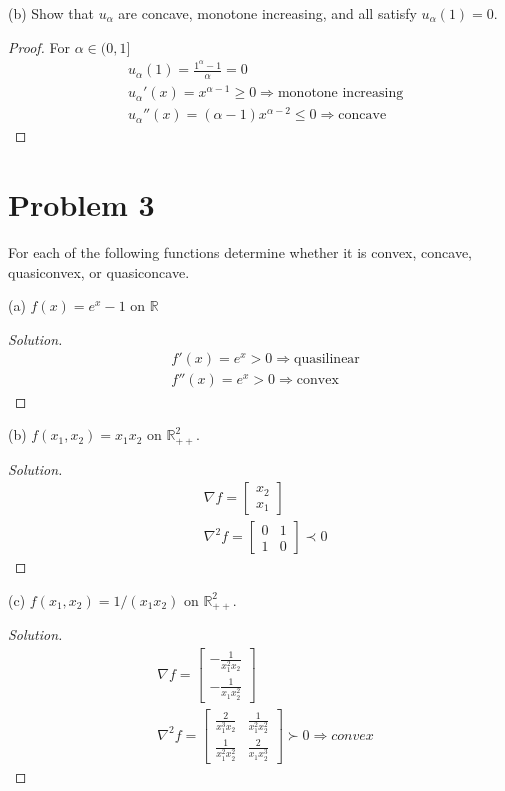 \documentclass[11pt]{article}
\newenvironment{solution}
  {\renewcommand\qedsymbol{$\square$}\begin{proof}[Solution]}
  {\end{proof}}
\newcommand{\grad}{\nabla}
\newcommand{\hess}{\nabla^2}
\newcommand{\RR}{\mathbb{R}}
\begin{document}
(b) Show that $u_\alpha$ are concave, monotone increasing, and all satisfy $u_\alpha(1) = 0$.

\begin{proof}
  For $\alpha\in(0, 1]$
  \begin{align*}
    &u_\alpha(1) = \frac{1^\alpha - 1}{\alpha} = 0\\
    &u_\alpha'(x) = x^{\alpha-1}\geq0 \Rightarrow\text{monotone increasing}\\
    &u_\alpha''(x) = (\alpha-1)x^{\alpha-2} \leq 0 \Rightarrow\text{concave}
  \end{align*}
\end{proof}

\clearpage
\section*{Problem 3}
For each of the following functions determine whether it is convex, concave, quasiconvex, or quasiconcave.

(a) $f(x)=e^x-1$ on $\RR$
\begin{solution}
  \begin{align*}
    &f'(x) = e^x > 0 \Rightarrow \text{quasilinear}\\
    &f''(x) = e^x > 0 \Rightarrow \text{convex}
  \end{align*}
\end{solution}

(b) $f\left(x_1, x_2\right)=x_1 x_2$ on $\RR_{++}^2$.
\begin{solution}
  \begin{align*}
    &\grad f = 
    \begin{bmatrix}
      x_2 \\x_1
    \end{bmatrix}\\
    &\hess f = 
    \begin{bmatrix}
      0 & 1\\1 & 0
    \end{bmatrix}\prec 0
  \end{align*}
\end{solution}

(c) $f\left(x_1, x_2\right)=1 /\left(x_1 x_2\right)$ on $\RR_{++}^2$.
\begin{solution}
  \begin{align*}
    &\grad f = 
    \begin{bmatrix}
      -\frac{1}{x_1^2x_2} \\ -\frac{1}{x_1x_2^2}
    \end{bmatrix}\\
    &\hess f = 
    \begin{bmatrix}
      \frac{2}{x_1^3x_2} & \frac{1}{x_1^2x_2^2} \\ \frac{1}{x_1^2x_2^2} & \frac{2}{x_1x_2^3}
    \end{bmatrix}\succ 0 \Rightarrow convex
  \end{align*}
\end{solution}
\end{document}
